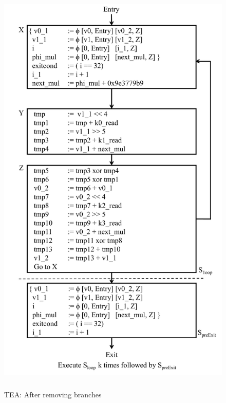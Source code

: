 \begin{figure}[H]
\begin{center}
\includegraphics[height=8in]{fig-proposal/tea-algorithm-after-removing-branches}
\caption{TEA: After removing branches}
\label{fig:tea-algorithm-after-removing-branches}
\end{center}
\end{figure}

